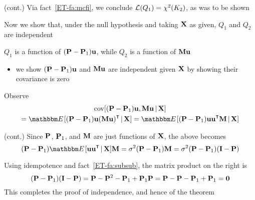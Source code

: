 \begin{frame}

    \vspace{2em}
    \Prf (cont.)
    Via fact~\ref{ET-fa:mcfi}, we conclude $\mathcal L(Q_1) =\chi^2(K_2)$, as was to be shown
    
    Now we show that, under the null
    hypothesis and taking $\mathbf X$ as given, $Q_1$ and $Q_2$ are independent
    
    \vspace{.7em}
    $Q_1$ is a function of $(\mathbf P -
    \mathbf P_1){\mathbf u}$, while $Q_2$ is a function of $\mathbf M {\mathbf u}$
    
    \begin{itemize}
        \item we show $(\mathbf P - \mathbf P_1){\mathbf u}$ and $\mathbf M {\mathbf u}$ are
        independent given $\mathbf X$ by showing their covariance is zero
    \end{itemize}
    
    Observe
    \begin{multline*}
        \cov [ (\boldP - \boldP_1) \boldu, \boldM \boldu \given \boldX ]
        \\ = \EE [ (\boldP - \boldP_1) \boldu (\boldM \boldu)^\T \given \boldX ]
        = \EE [ (\boldP - \boldP_1) \boldu \boldu^\T \boldM  \given \boldX ]
    \end{multline*}
    
\end{frame}

\begin{frame}

    \vspace{2em}
    \Prf (cont.)
    Since $\mathbf P$, $\mathbf P_1$, and $\mathbf M$ are just functions of $\mathbf X$,
    the above becomes
    \begin{equation*}
        (\boldP - \boldP_1) \EE [\boldu \boldu^\T\given \boldX ] \boldM  
        = \sigma^2 (\boldP - \boldP_1) \boldM  
        = \sigma^2 (\boldP - \boldP_1) (\boldI - \boldP)
    \end{equation*}
    
    \vspace{.7em}
    Using idempotence and fact~\ref{ET-fa:subsub}, the matrix product on the
    right is
    \begin{equation*}
        (\mathbf P - \mathbf P_1) (\mathbf I - \mathbf P)
        = \mathbf P - \mathbf P^2 - \mathbf P_1 + \mathbf P_1 \mathbf P
        = \mathbf P - \mathbf P - \mathbf P_1 + \mathbf P_1 
        = {\mathbf 0}
    \end{equation*}
    This completes the proof of independence, and hence of
    the theorem  \qedsymbol 
    
\end{frame}

